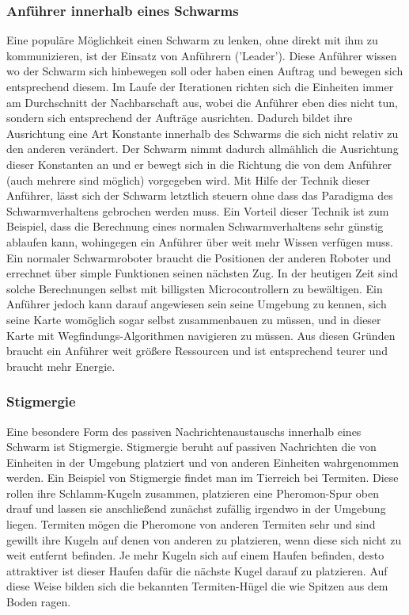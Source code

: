 \subsubsection*{Anführer innerhalb eines Schwarms}\label{subsubsec:Anführer}
Eine populäre Möglichkeit einen Schwarm zu lenken, ohne direkt mit ihm zu kommunizieren, ist der Einsatz von Anführern ('Leader').
Diese Anführer wissen wo der Schwarm sich hinbewegen soll oder haben einen Auftrag und bewegen sich entsprechend diesem.
Im Laufe der Iterationen richten sich die Einheiten immer am Durchschnitt der Nachbarschaft aus, wobei die Anführer eben dies nicht tun, sondern sich entsprechend der Aufträge ausrichten.
Dadurch bildet ihre Ausrichtung eine Art Konstante innerhalb des Schwarms die sich nicht relativ zu den anderen verändert.
Der Schwarm nimmt dadurch allmählich die Ausrichtung dieser Konstanten an und er bewegt sich in die Richtung die von dem Anführer (auch mehrere sind möglich) vorgegeben wird.
Mit Hilfe der Technik dieser Anführer, lässt sich der Schwarm letztlich steuern ohne dass das Paradigma des Schwarmverhaltens gebrochen werden muss.
Ein Vorteil dieser Technik ist zum Beispiel, dass die Berechnung eines normalen Schwarmverhaltens sehr günstig ablaufen kann, wohingegen ein Anführer über weit mehr Wissen verfügen muss. Ein normaler Schwarmroboter braucht die Positionen der anderen Roboter und errechnet über simple Funktionen seinen nächsten Zug. In der heutigen Zeit sind solche Berechnungen selbst mit billigsten Microcontrollern zu bewältigen. Ein Anführer jedoch kann darauf angewiesen sein seine Umgebung zu kennen, sich seine Karte womöglich sogar selbst zusammenbauen zu müssen, und in dieser Karte mit Wegfindungs-Algorithmen navigieren zu müssen. Aus diesen Gründen braucht ein Anführer weit größere Ressourcen und ist entsprechend teurer und braucht mehr Energie.\cite{VicsekLeader}\cite{RobotLeader}

\subsubsection*{Stigmergie}\label{subsubsec:Stigmergie}

Eine besondere Form des passiven Nachrichtenaustauschs innerhalb eines Schwarm ist Stigmergie.
Stigmergie beruht auf passiven Nachrichten die von Einheiten in der Umgebung platziert und von anderen Einheiten wahrgenommen werden.
Ein Beispiel von Stigmergie findet man im Tierreich bei Termiten.
Diese rollen ihre Schlamm-Kugeln zusammen, platzieren eine Pheromon-Spur oben drauf und lassen sie anschließend zunächst zufällig irgendwo in der Umgebung liegen.
Termiten mögen die Pheromone von anderen Termiten sehr und sind gewillt ihre Kugeln auf denen von anderen zu platzieren, wenn diese sich nicht zu weit entfernt befinden.
Je mehr Kugeln sich auf einem Haufen befinden, desto attraktiver ist dieser Haufen dafür die nächste Kugel darauf zu platzieren.
Auf diese Weise bilden sich die bekannten Termiten-Hügel die wie Spitzen aus dem Boden ragen.\cite{Stigmergie}

